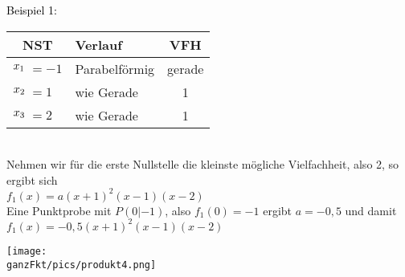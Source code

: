 \begin{minipage}{\linewidth}
	{\color{loes}\begin{minipage}{0.5\linewidth}
			\textcolor{black}{Beispiel 1:}\\
			\begin{tabular}{rllc}
				\multicolumn{2}{c}{NST}&Verlauf&VFH\\
				\midrule
				\(x_1\hspace{-0.3cm}\)&\(=-1\)&Parabelförmig&gerade\\
				\(x_2\hspace{-0.3cm}\)&\(=1\)&wie Gerade&1\\
				\(x_3\hspace{-0.3cm}\)&\(=2\)&wie Gerade&1
			\end{tabular}\\
			Nehmen wir für die erste Nullstelle die kleinste mögliche Vielfachheit, also 2, so ergibt sich\\
			\(f_1(x)=a\left(x+1\right)^2 \left(x-1\right) \left(x-2\right) \)\\
			Eine Punktprobe mit \(P(0|-1)\), also \(f_1(0)=-1\) ergibt \(a=-0,5\) und damit\\
			\(f_1(x)=-0,5\left(x+1\right)^2 \left(x-1\right) \left(x-2\right) \)
	\end{minipage}}
	\begin{minipage}{0.5\linewidth}
		\texttt{[image: \\ganzFkt/pics/produkt4.png]}
	\end{minipage}
\end{minipage}\\ \vspace{.15cm}\\
